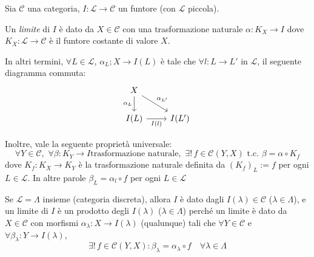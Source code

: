 \begin{definition}{}
    Sia \(\mathcal{C}\) una categoria, \(I : \mathcal{L} \to \mathcal{C}\) un
    funtore (con \(\mathcal{L}\) piccola).

    Un \emph{limite} di \(I\) è dato da \(X \in \mathcal{C}\) con una
    trasformazione naturale \(\alpha : K_X \to I\) dove \(K_X : \mathcal{L} \to \mathcal{C}\) è il funtore 
    costante di valore \(X\).

    In altri termini, \(\forall L \in \mathcal{L}\), \(\alpha_L ; X \to I{(L)}\) è tale che \(\forall l : L \to L'\) in \(\mathcal{L}\), il seguente diagramma commuta:
\[\begin{tikzcd}
	X \\
	{I(L)} & {I(L')}
	\arrow["{\alpha_L}"', from=1-1, to=2-1]
	\arrow["{\alpha_{L'}}", from=1-1, to=2-2]
	\arrow["{I(l)}"', from=2-1, to=2-2]
\end{tikzcd}\]

    Inoltre, vale la seguente proprietà universale:
    \[
      \forall Y \in \mathcal{C}, \,\, \forall \beta : K_Y \to I \text{
      trasformazione naturale, } \, \exists  ! \, f \in \mathcal{C}{(Y, X)} \text{ t.c. } \beta = \alpha \circ K_f
    \]
    dove \(K_f : K_X \to K_Y\) è la trasformazione naturale definita da \({(K_f)}_L := f \) per ogni \(L \in \mathcal{L}\). In altre parole \(\beta_L = \alpha_l \circ f\) per ogni \(L \in \mathcal{L}\) 

\end{definition}

\begin{example}[Prodotto]
    Se \(\mathcal{L} = \Lambda\) insieme (categoria discreta), allora \(I\) è
    dato dagli \(I{(\lambda)} \in \mathcal{C}\) (\(\lambda \in \Lambda\)), e un
    limite di \(I\) è un prodotto degli \(I{(\lambda)}\) (\(\lambda \in \Lambda\)) perché un limite 
    è dato da \(X \in \mathcal{C}\) con morfismi \(\alpha_\lambda : X \to I{(\lambda)}\) (qualunque) tali che \(\forall Y \in \mathcal{C}\) e \(\forall \beta_\lambda : Y \to I{(\lambda)}\),
    \[
      \exists ! \, f \in \mathcal{C}{(Y, X)} : \beta_\lambda  = \alpha_\lambda
      \circ f \quad \forall \lambda \in \Lambda
    \]
\end{example}

